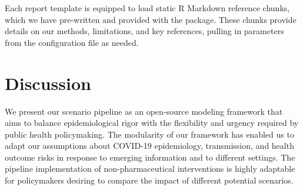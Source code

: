 Each report template is equipped to load static R Markdown reference chunks, which we have pre-written and provided with the package. These chunks provide details on our methods, limitations, and key references, pulling in parameters from the configuration file as needed.

\section{Discussion}
We present our scenario pipeline as an open-source modeling framework that aims to balance epidemiological rigor with the flexibility and urgency required by public health policymaking. The modularity of our framework has enabled us to adapt our assumptions about COVID-19 epidemiology, transmission, and health outcome risks in response to emerging information and to different settings. The pipeline implementation of non-pharmaceutical interventions is highly adaptable for policymakers desiring to compare the impact of different potential scenarios.


